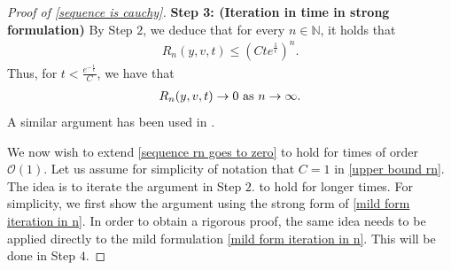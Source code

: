 \documentclass[11pt]{article}
\numberwithin{equation}{section}
\begin{document}
\begin{proof}[Proof of \eqref{sequence is cauchy}]
\vspace{0.2cm}

{\bf Step 3: (Iteration in time in strong formulation)}
By Step $2$, we deduce that for every $n\in\mathbb{N}$, it holds that
\begin{align}\label{upper bound rn}
    R_{n}(y,v,t)\leq (Cte^{\frac{1}{\epsilon}})^{n}.
\end{align}
Thus, for $t< \frac{e^{-\frac{1}{\epsilon}}}{C}$, we have that
\begin{align}\label{sequence rn goes to zero}
      R_{n}(y,v,t)\rightarrow 0 \textup{ as } n \rightarrow \infty.
\end{align}
A similar argument has been used in \cite{cristianinhom}.


We now wish to extend \eqref{sequence rn goes to zero} to hold for times of order $\mathcal{O}(1)$. Let us assume for simplicity of notation that $C=1$ in \eqref{upper bound rn}. The idea is to iterate the argument in Step $2.$ to hold for longer times. For simplicity, we first show the argument using the strong form of 
\eqref{mild form iteration in n}. In order to obtain a rigorous proof, the same idea needs to be applied directly to the mild formulation \eqref{mild form iteration in n}. This will be done in Step $4.$

\vspace{0.2cm}


\end{proof}
\end{document}
